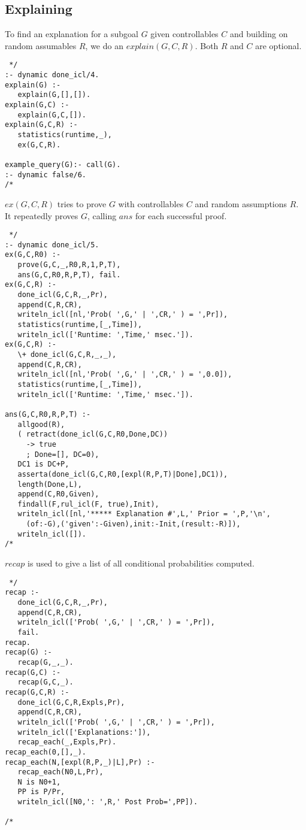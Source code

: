 \documentclass[11pt,fleqn]{article}
\begin{document}
\subsection{Explaining}
To find an explanation for a subgoal $G$ given controllables $C$ and
building on random assumables $R$, we do
an $explain(G,C,R)$. Both $R$ and $C$ are optional.
\begin{verbatim} */
:- dynamic done_icl/4.
explain(G) :-
   explain(G,[],[]).
explain(G,C) :-
   explain(G,C,[]).
explain(G,C,R) :-
   statistics(runtime,_),
   ex(G,C,R).

example_query(G):- call(G).
:- dynamic false/6.
/* \end{verbatim}

$ex(G,C,R)$ tries to prove $G$ with controllables $C$ and random
assumptions $R$. It repeatedly proves $G$, calling $ans$ for each
successful proof.
\begin{verbatim} */
:- dynamic done_icl/5.
ex(G,C,R0) :- 
   prove(G,C,_,R0,R,1,P,T), 
   ans(G,C,R0,R,P,T), fail.
ex(G,C,R) :-
   done_icl(G,C,R,_,Pr),
   append(C,R,CR),   
   writeln_icl([nl,'Prob( ',G,' | ',CR,' ) = ',Pr]),
   statistics(runtime,[_,Time]),
   writeln_icl(['Runtime: ',Time,' msec.']).
ex(G,C,R) :-
   \+ done_icl(G,C,R,_,_),
   append(C,R,CR),
   writeln_icl([nl,'Prob( ',G,' | ',CR,' ) = ',0.0]),
   statistics(runtime,[_,Time]),
   writeln_icl(['Runtime: ',Time,' msec.']).

ans(G,C,R0,R,P,T) :-
   allgood(R),
   ( retract(done_icl(G,C,R0,Done,DC))
     -> true
     ; Done=[], DC=0),
   DC1 is DC+P,
   asserta(done_icl(G,C,R0,[expl(R,P,T)|Done],DC1)),
   length(Done,L),
   append(C,R0,Given),
   findall(F,rul_icl(F, true),Init),
   writeln_icl([nl,'***** Explanation #',L,' Prior = ',P,'\n',     
     (of:-G),('given':-Given),init:-Init,(result:-R)]),
   writeln_icl([]).
/* \end{verbatim}

$recap$ is used to give a list of all conditional probabilities computed.
\begin{verbatim} */
recap :-
   done_icl(G,C,R,_,Pr),
   append(C,R,CR),
   writeln_icl(['Prob( ',G,' | ',CR,' ) = ',Pr]),
   fail.
recap.
recap(G) :-
   recap(G,_,_).
recap(G,C) :-
   recap(G,C,_).
recap(G,C,R) :-
   done_icl(G,C,R,Expls,Pr),
   append(C,R,CR),
   writeln_icl(['Prob( ',G,' | ',CR,' ) = ',Pr]),
   writeln_icl(['Explanations:']),
   recap_each(_,Expls,Pr).
recap_each(0,[],_).
recap_each(N,[expl(R,P,_)|L],Pr) :-
   recap_each(N0,L,Pr),
   N is N0+1,
   PP is P/Pr,
   writeln_icl([N0,': ',R,' Post Prob=',PP]).
   
/* \end{verbatim}
\end{document}
